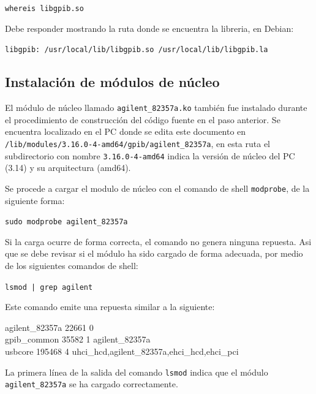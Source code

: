 \documentclass[paper=letter,oneside,fontsize=11pt]{article}
\begin{document}
		\texttt{whereis libgpib.so}
		
		Debe responder mostrando la ruta donde se encuentra la libreria, en Debian:
		
		\texttt{libgpib: /usr/local/lib/libgpib.so /usr/local/lib/libgpib.la}	
		
		\subsection{Instalación de módulos de núcleo}
		
		El módulo de núcleo llamado \texttt{agilent\_82357a.ko} también fue instalado durante el procedimiento de construcción del código fuente en el paso anterior. Se encuentra localizado en el PC donde se edita este documento en \texttt{/lib/modules/3.16.0-4-amd64/gpib/agilent\_82357a}, en esta ruta el subdirectorio con nombre \texttt{3.16.0-4-amd64} indica la versión de núcleo del PC (3.14) y su arquitectura (amd64). 
		
		Se procede a cargar el modulo de núcleo con el comando de shell \texttt{modprobe}, de la siguiente forma:
		
		\texttt{sudo modprobe agilent\_82357a}
		
		Si la carga ocurre de forma correcta, el comando no genera ninguna repuesta. Asi que se debe revisar si el módulo ha sido cargado de forma adecuada, por medio de los siguientes comandos de shell:
		
		\texttt{lsmod | grep agilent}
		
		Este comando emite una repuesta similar a la siguiente:

		\begin{flushleft}			
		\begin{ttfamily}	
			agilent\_82357a	22661  0 \\				
			gpib\_common	35582  1 agilent\_82357a  \\				
			usbcore	195468  4 uhci\_hcd,agilent\_82357a,ehci\_hcd,ehci\_pci \\
		\end{ttfamily}
		\end{flushleft}
		
		La primera línea de la salida del comando \texttt{lsmod} indica que el módulo \texttt{agilent\_82357a} se ha cargado correctamente. 	
		
\end{document}
